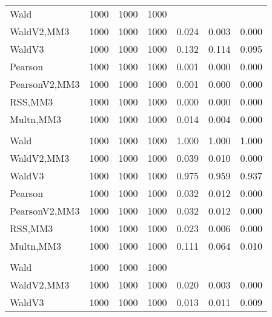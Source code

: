 \documentclass[
]{article}
\begin{document}
\begin{table}[H]
{\begin{tabular}[t]{lrrrrrr}
\hspace{1em}Wald & 1000 & 1000 & 1000 &  &  \vphantom{1} & \\
\hspace{1em}WaldV2,MM3 & 1000 & 1000 & 1000 & 0.024 & 0.003 & 0.000\\
\hspace{1em}WaldV3 & 1000 & 1000 & 1000 & 0.132 & 0.114 & 0.095\\
\hspace{1em}Pearson & 1000 & 1000 & 1000 & 0.001 & 0.000 & 0.000\\
\hspace{1em}PearsonV2,MM3 & 1000 & 1000 & 1000 & 0.001 & 0.000 & 0.000\\
\hspace{1em}RSS,MM3 & 1000 & 1000 & 1000 & 0.000 & 0.000 & 0.000\\
\hspace{1em}Multn,MM3 & 1000 & 1000 & 1000 & 0.014 & 0.004 & 0.000\\
\addlinespace[0.3em]
\multicolumn{7}{l}{\textbf{2F 10V}}\\
\hspace{1em}Wald & 1000 & 1000 & 1000 & 1.000 & 1.000 & 1.000\\
\hspace{1em}WaldV2,MM3 & 1000 & 1000 & 1000 & 0.039 & 0.010 & 0.000\\
\hspace{1em}WaldV3 & 1000 & 1000 & 1000 & 0.975 & 0.959 & 0.937\\
\hspace{1em}Pearson & 1000 & 1000 & 1000 & 0.032 & 0.012 & 0.000\\
\hspace{1em}PearsonV2,MM3 & 1000 & 1000 & 1000 & 0.032 & 0.012 & 0.000\\
\hspace{1em}RSS,MM3 & 1000 & 1000 & 1000 & 0.023 & 0.006 & 0.000\\
\hspace{1em}Multn,MM3 & 1000 & 1000 & 1000 & 0.111 & 0.064 & 0.010\\
\addlinespace[0.3em]
\multicolumn{7}{l}{\textbf{3F 15V}}\\
\hspace{1em}Wald & 1000 & 1000 & 1000 &  &  & \\
\hspace{1em}WaldV2,MM3 & 1000 & 1000 & 1000 & 0.020 & 0.003 & 0.000\\
\hspace{1em}WaldV3 & 1000 & 1000 & 1000 & 0.013 & 0.011 & 0.009\\

\end{tabular}}
\end{table}
\end{document}
